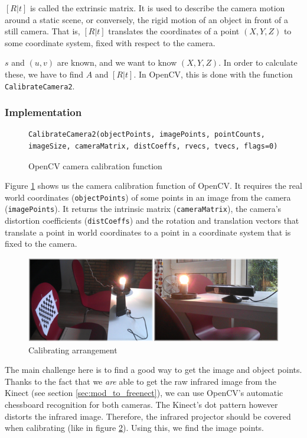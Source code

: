 $\left[R|t\right]$ is called the extrinsic matrix. It is used to describe the
camera motion around a static scene, or conversely, the rigid motion of an
object in front of a still camera. That is, $\left[R|t\right]$ translates the
coordinates of a point $\left( X, Y, Z \right)$ to some coordinate system, fixed
with respect to the camera.

$s$ and $\left( u, v \right)$ are known, and we want to know $\left( X, Y, Z
\right)$. In order to calculate these, we have to find $A$ and
$\left[R|t\right]$. In OpenCV, this is done with the function
\verb|CalibrateCamera2|.

\subsubsection{Implementation}
\begin{figure}[H]
\begin{lstlisting}
CalibrateCamera2(objectPoints, imagePoints, pointCounts, imageSize, cameraMatrix, distCoeffs, rvecs, tvecs, flags=0)
\end{lstlisting}
\caption{OpenCV camera calibration function}
\label{code:calibratecamera2}
\end{figure}

Figure \ref{code:calibratecamera2} shows us the camera calibration function of
OpenCV. It requires the real world coordinates (\verb|objectPoints|) of some
points in an image from the camera (\verb|imagePoints|). It returns the
intrinsic matrix (\verb|cameraMatrix|), the camera's distortion coefficients
(\verb|distCoeffs|) and the rotation and translation vectors that translate a
point in world coordinates to a point in a coordinate system that is fixed to
the camera.

\begin{figure}[H]
\centering
\includegraphics[scale=0.6]{images/calibrating.png}
\caption{Calibrating arrangement}
\label{fig:calibrating}
\end{figure}

The main challenge here is to find a good way to get the image and object
points. Thanks to the fact that we \emph{are} able to get the raw infrared image
from the Kinect (see section \ref{sec:mod_to_freenect}), we can use OpenCV's
automatic chessboard recognition for both cameras. The Kinect's dot pattern
however distorts the infrared image. Therefore, the infrared projector should be
covered when calibrating (like in figure \ref{fig:calibrating}). Using this, we
find the image points.

